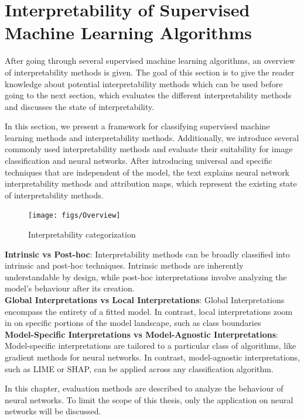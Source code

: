 \chapter{Interpretability of Supervised Machine Learning Algorithms}
\label{sec:IoNN}


After going through several supervised machine learning algorithms, an overview of interpretability methods is given. The goal of this section is to give the reader knowledge about potential interpretability methods which can be used before going to the next section, which evaluates the different interpretability methods and discusses the state of interpretability.


In this section, we present a framework \cite{allen2023interpretable} for classifying supervised machine learning methods and interpretability methods. Additionally, we introduce several commonly used interpretability methods and evaluate their suitability for image classification and neural networks.  After introducing universal and specific techniques that are independent of the model, the text explains neural network interpretability methods and attribution maps, which represent the existing state of interpretability methods.


\begin{figure}[h!]
	\centering
	\texttt{[image: figs/Overview]}
	\caption[Interpretability categorization]{Interpretability categorization \cite{allen2023interpretable}}
	\label{fig:IML_Overview}
\end{figure}

\textbf{Intrinsic vs Post-hoc}: Interpretability methods can be broadly classified into intrinsic and post-hoc techniques. Intrinsic methods are inherently understandable by design, while post-hoc interpretations involve analyzing the model's behaviour after its creation.
\\
\textbf{Global Interpretations vs Local Interpretations}: Global Interpretations encompass the entirety of a fitted model. In contrast, local interpretations zoom in on specific portions of the model landscape, such as class boundaries
\\
\textbf{Model-Specific Interpretations vs Model-Agnostic Interpretations}: 
Model-specific interpretations are tailored to a particular class of algorithms, like gradient methods for neural networks. In contrast, model-agnostic interpretations, such as LIME or SHAP, can be applied across any classification algorithm.

In this chapter, evaluation methods are described to analyze the behaviour of neural networks. To limit the scope of this thesis, only the application on neural networks will be discussed.

